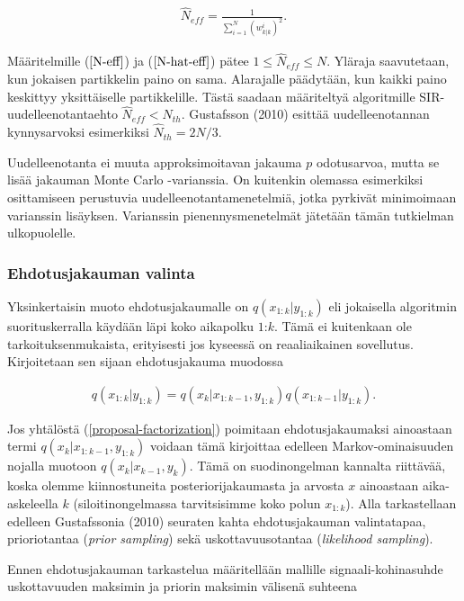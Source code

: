 \documentclass[
  12pt,
  a4paper, twoside]{book}
\begin{document}
\begin{align}\label{N-hat-eff}
\hat{N}_{eff}=\frac{1}{\sum_{i=1}^N(w^i_{k|k})^2}.
\end{align}

Määritelmille (\(\ref{N-eff}\)) ja (\(\ref{N-hat-eff}\)) pätee \(1 \leq \hat{N}_{eff} \leq N\). Yläraja saavutetaan, kun jokaisen partikkelin paino on sama. Alarajalle päädytään, kun kaikki paino keskittyy yksittäiselle partikkelille. Tästä saadaan määriteltyä algoritmille SIR-uudelleenotantaehto \(\hat{N}_{eff}< N_{th}\). Gustafsson (2010) \citep{gustafsson-2010} esittää uudelleenotannan kynnysarvoksi esimerkiksi \(\hat{N}_{th}=2N/3\).

Uudelleenotanta ei muuta approksimoitavan jakauma \(p\) odotusarvoa, mutta se lisää jakauman Monte Carlo -varianssia. On kuitenkin olemassa esimerkiksi osittamiseen perustuvia uudelleenotantamenetelmiä, jotka pyrkivät minimoimaan varianssin lisäyksen. Varianssin pienennysmenetelmät jätetään tämän tutkielman ulkopuolelle.

\subsubsection{Ehdotusjakauman valinta}

Yksinkertaisin muoto ehdotusjakaumalle on \(q(x_{1:k}|y_{1:k})\) eli jokaisella algoritmin suorituskerralla käydään läpi koko aikapolku \(1\):\(k\). Tämä ei kuitenkaan ole tarkoituksenmukaista, erityisesti jos kyseessä on reaaliaikainen sovellutus. Kirjoitetaan sen sijaan ehdotusjakauma muodossa

\begin{align}\label{proposal-factorization}
q(x_{1:k}|y_{1:k})=q(x_k|x_{1:k-1},y_{1:k})q(x_{1:k-1}|y_{1:k}).
\end{align}

Jos yhtälöstä (\ref{proposal-factorization}) poimitaan ehdotusjakaumaksi ainoastaan termi \(q(x_k|x_{1:k-1},y_{1:k})\) voidaan tämä kirjoittaa edelleen Markov-ominaisuuden nojalla muotoon \(q(x_k|x_{k-1},y_{k})\). Tämä on suodinongelman kannalta riittävää, koska olemme kiinnostuneita posteriorijakaumasta ja arvosta \(x\) ainoastaan aika-askeleella \(k\) (siloitinongelmassa tarvitsisimme koko polun \(x_{1:k}\)). Alla tarkastellaan edelleen Gustafssonia (2010) \citep{gustafsson-2010} seuraten kahta ehdotusjakauman valintatapaa, prioriotantaa (\emph{prior sampling}) sekä uskottavuusotantaa (\emph{likelihood sampling}).

Ennen ehdotusjakauman tarkastelua määritellään mallille signaali-kohinasuhde uskottavuuden maksimin ja priorin maksimin välisenä suhteena
\end{document}
